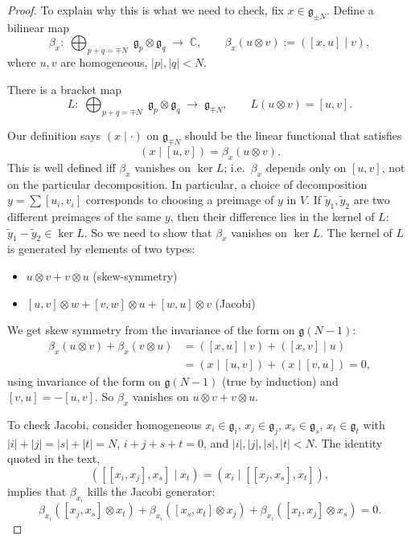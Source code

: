 \documentclass[12pt]{article}
\begin{document}
\begin{proof}
    To explain why this is what we need to check, fix $x\in \mathfrak g_{\pm N}$. Define a bilinear map
    \[
        \beta_x:\;\bigoplus_{p+q=\mp N}\; \mathfrak g_p\otimes \mathfrak g_q \;\longrightarrow\; \mathbb C,\qquad
        \beta_x(u\otimes v):=([x,u]\mid v),
    \]
    where $u,v$ are homogeneous, $|p|,|q|<N$.

    There is a bracket map
    \[
        L:\;\bigoplus_{p+q=\mp N}\; \mathfrak g_p\otimes \mathfrak g_q \;\longrightarrow\; \mathfrak g_{\mp N},\qquad
        L(u\otimes v)=[u,v].
    \]

    Our definition says $(x\mid \cdot)$ on $\mathfrak g_{\mp N}$ should be the linear functional that satisfies
    \[
        (x\mid [u,v])=\beta_x(u\otimes v).
    \]
    This is well defined iff $\beta_x$ vanishes on $\ker L$; i.e.\ $\beta_x$ depends only on $[u,v]$, not on the particular decomposition. In particular, a choice of decomposition $y=\sum [u_i,v_i]$ corresponds to choosing a preimage of $y$ in $V$. If $\tilde y_1,\tilde y_2$ are two different preimages of the same $y$, then their difference lies in the kernel of $L$: $\tilde y_1-\tilde y_2\in \ker L$.
    So we need to show that $\beta_x$ vanishes on $\ker L$. The kernel of $L$ is generated by elements of two types:
    \begin{itemize}
        \item $u\otimes v + v\otimes u$ (skew-symmetry)
        \item $[u,v]\otimes w + [v,w]\otimes u + [w,u]\otimes v$ (Jacobi)
    \end{itemize}


    We get skew symmetry from the invariance of the form on $\mathfrak g(N-1)$:
    \begin{align*}
        \beta_x(u\otimes v)+\beta_x(v\otimes u)
         & =([x,u]\mid v)+([x,v]\mid u)    \\
         & =(x\mid [u,v])+(x\mid [v,u])=0,
    \end{align*}
    using invariance of the form on $\mathfrak g(N-1)$ (true by induction) and $[v,u]=-[u,v]$. So $\beta_x$ vanishes on $u\otimes v+v\otimes u$.

    To check Jacobi, consider homogeneous $x_i\in \mathfrak g_i$, $x_j\in \mathfrak g_j$, $x_s\in \mathfrak g_s$, $x_t\in \mathfrak g_t$ with
    $|i|+|j|=|s|+|t|=N$, $i+j+s+t=0$, and $|i|,|j|,|s|,|t|<N$.
    The identity quoted in the text,
    \[
        ([[x_i,x_j],x_s]\mid x_t)=(x_i\mid [[x_j,x_s],x_t]),
    \]
    implies that $\beta_{x_i}$ kills the Jacobi generator:
    \[
        \beta_{x_i}([x_j,x_s]\otimes x_t)+\beta_{x_i}([x_s,x_t]\otimes x_j)+\beta_{x_i}([x_t,x_j]\otimes x_s)=0.
    \]


\end{proof}
\end{document}
